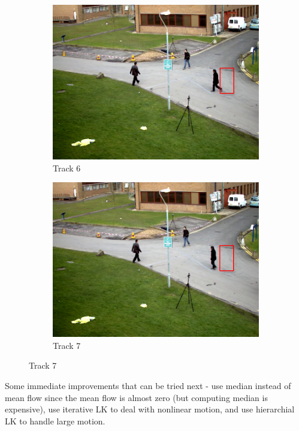 \documentclass[a4paper,11]{article}
\begin{document}
\begin{figure}[H]
  \begin{subfigure}{0.5\textwidth}
   \centering
   \includegraphics[width=0.8\linewidth]{track6.png}
   \caption{Track 6}
   \end{subfigure}
   \begin{subfigure}{0.5\textwidth}
    \centering
    \includegraphics[width=0.8\linewidth]{track7.png}
    \caption{Track 7}
   \end{subfigure}
   
\end{figure}

Some immediate improvements that can be tried next - use median instead of mean flow since the mean flow is almost zero (but computing median is expensive), use iterative LK to deal with nonlinear motion, and use hierarchial LK to handle large motion.
\end{document}
